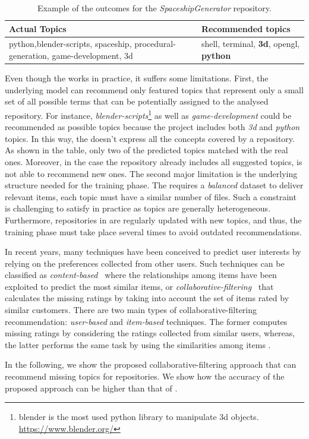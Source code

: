 \begin{table}[h]
\centering
\resizebox{8.5cm}{!} {
\footnotesize
\begin{tabular}{| p{3.2cm} | p{3.2cm} | }
\hline
 \textbf{Actual Topics} &\textbf{ Recommended topics} \\ \hline
     python,blender-scripts, spaceship, procedural-generation, 
     game-development, 3d        &  
  shell, terminal, \textbf{3d},    opengl,    \textbf{python}        \\ \hline

\end{tabular}
}
\caption{Example of the \MNB outcomes for the \emph{SpaceshipGenerator} repository.}
\label{tab:example}
\end{table} 


Even though the \MNB works in practice, it suffers some limitations. First, the 
underlying model can recommend only featured topics that represent only a small 
set of all possible terms that can be potentially assigned to the analysed 
repository.
%
For instance, \emph{blender-scripts}\footnote{blender is the most used python 
library to manipulate 3d objects. \url{https://www.blender.org/}} as well as 
\emph{game-development} could be recommended as possible topics because the 
project includes both \emph{3d} and \emph{python} topics.
In this way, the \MNB doesn't express all the concepts covered by a \GH 
repository. As shown in the table, only two of the predicted topics matched 
with the real ones. Moreover, in the case the repository already includes all 
suggested topics, \MNB is not able to recommend new ones.
The second major limitation is the underlying structure needed for the training 
phase. The \MNB requires a \emph{balanced} dataset to deliver relevant items, 
\ie each topic must have a similar number of  \RM files. Such a constraint is 
challenging to satisfy in practice as topics are generally heterogeneous. 
Furthermore, repositories in \GH are regularly updated with new topics, and 
thus, the training phase must take place several times to avoid outdated 
recommendations. 

In recent years, many techniques have been conceived to predict user interests 
by relying on the preferences collected from other users. Such techniques can 
be classified as  \emph{content-based}~\cite{Pazzani2007} where the 
relationships among items have been exploited to predict the most similar items,
or \emph{collaborative-filtering}~\cite{Miranda:2008:ICF:1486927.1487083} that 
calculates the missing ratings by taking into account the set of items rated by 
similar customers. There are two main types of collaborative-filtering 
recommendation: \emph{user-based} \cite{Zhao:2010:UCR:1748610.1749278} and 
\emph{item-based} \cite{Sarwar:2001:ICF:371920.372071} techniques. The former 
computes missing ratings by considering the ratings collected from similar 
users, whereas, the latter performs the same task by using the similarities 
among items \cite{Cremonesi:2008:EMC:1468165.1468327}.

In the following, we show the proposed collaborative-filtering approach that 
can recommend missing topics for \GH repositories. We show how the accuracy of 
the proposed approach can be higher than that of \MNB.
